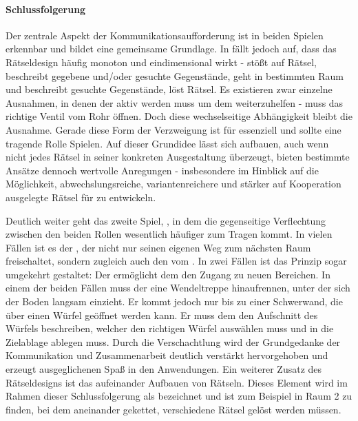 \paragraph{Schlussfolgerung}
Der zentrale Aspekt der Kommunikationsaufforderung ist in beiden Spielen erkennbar und bildet eine gemeinsame Grundlage. In  fällt jedoch auf, dass das Rätseldesign häufig monoton und eindimensional wirkt -  stößt auf Rätsel, beschreibt gegebene und/oder gesuchte Gegenstände,  geht in bestimmten Raum und beschreibt gesuchte Gegenstände,  löst Rätsel. Es existieren zwar einzelne Ausnahmen, in denen der  aktiv werden muss um dem  weiterzuhelfen -  muss das richtige Ventil vom Rohr öffnen. Doch diese wechselseitige Abhängigkeit bleibt die Ausnahme. Gerade diese Form der Verzweigung ist für  essenziell und sollte eine tragende Rolle Spielen. Auf dieser Grundidee lässt sich aufbauen, auch wenn nicht jedes Rätsel in seiner konkreten Ausgestaltung überzeugt, bieten bestimmte Ansätze dennoch wertvolle Anregungen - insbesondere im Hinblick auf die Möglichkeit, abwechslungsreiche, variantenreichere und stärker auf Kooperation ausgelegte Rätsel für  zu entwickeln.

Deutlich weiter geht das zweite Spiel, , in dem die gegenseitige Verflechtung zwischen den beiden Rollen wesentlich häufiger zum Tragen kommt. In vielen Fällen ist es der , der nicht nur seinen eigenen Weg zum nächsten Raum freischaltet, sondern zugleich auch den vom . In zwei Fällen ist das Prinzip sogar umgekehrt gestaltet: Der  ermöglicht dem  den Zugang zu neuen Bereichen. In einem der beiden Fällen muss der  eine Wendeltreppe hinaufrennen, unter der sich der Boden langsam einzieht. Er kommt jedoch nur bis zu einer Schwerwand, die über einen Würfel geöffnet werden kann. Er muss dem  den Aufschnitt des Würfels beschreiben, welcher den richtigen Würfel auswählen muss und in die Zielablage ablegen muss. Durch die Verschachtlung wird der Grundgedanke der Kommunikation und Zusammenarbeit deutlich verstärkt hervorgehoben und erzeugt ausgeglichenen Spaß in den Anwendungen. Ein weiterer Zusatz des Rätseldesigns ist das aufeinander Aufbauen von Rätseln. Dieses Element wird im Rahmen dieser Schlussfolgerung als  bezeichnet und ist zum Beispiel in Raum 2 zu finden, bei dem aneinander gekettet, verschiedene Rätsel gelöst werden müssen.

